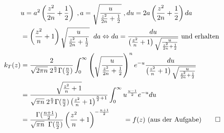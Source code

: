 \documentclass[a4paper]{article}
\begin{document}
\begin{align*}
	& u = a ^{2} \left(
		\frac{z^2}{2n} + \frac{ 1 }{ 2 }
	\right) \;,
	a = \sqrt{ \frac{ u }{  \frac{z^2}{2n} + \frac{ 1 }{ 2 }} }\; ,
	du = 2a \left(
		\frac{z^2}{2n} + \frac{ 1 }{ 2 }
	\right) da \\
	&= \left(
		\frac{ z^2 }{ n } + 1
		\right) \sqrt{
		\frac{ u }{ \frac{ z^2 }{ 2n } + \frac{ 1 }{ 2 } }
	} \;\; da
	\Leftrightarrow da = \frac{ du }{ \left(
		\frac{ z^2 }{ n } + 1
		\right) \sqrt{
		\frac{ u }{ \frac{ z^2 }{ 2n } + \frac{ 1 }{ 2 } }
	} } \text{ und erhalten } \\
	k_T (z) &= \frac{ 2 }{ 
		\sqrt{2 \pi n}\;  2 ^{\frac{ n }{ 2 }} \Gamma( \frac{ n }{ 2 } )
	}
	\int_{0}^{\infty} \left(
		\sqrt{ \frac{ u }{ \frac{ z^2 }{ 2n } + \frac{ 1 }{ 2 } } } 
	\right) ^{n}
	e ^{-u}
	\frac{ du }{ \left(
		\frac{ z^2 }{ n } + 1
		\right) \sqrt{\frac{ u }{ 
			\frac{ z^2 }{ 2n } + \frac{ 1 }{ 2 }
	}} 
} \\
	&= \frac{ \sqrt{
			\frac{ z^2 }{ n } + 1
		}  }{ 
		\sqrt{\pi n}\;  2 ^{\frac{ n }{ 2 }} \Gamma( \frac{ n }{ 2 } )
		\left(
			\frac{ z^2 }{ n } + 1
		\right) ^{\frac{ n }{ 2 } + 1}
	}
	\int_{0}^{\infty} u ^{\frac{u-1}{2}} e ^{-u} du \\
	&= \frac{ 
		\Gamma(\frac{n+1}{2})
	}{ \sqrt{\pi n} \;\;  \Gamma(\frac{ n }{ 2 })}
	\left(
		\frac{ z^2 }{ n } + 1
	\right) ^{ - 
		\frac{n+1}{2}
	} \qquad = f(z) \text{  (aus der Aufgabe)} \qed
\end{align*}
\end{document}
